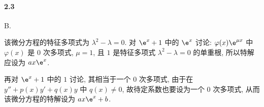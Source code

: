 \paragraph*{2.3} B.

该微分方程的特征多项式为 $\lambda^2 - \lambda = 0$. 对 $\e^x + 1$ 中的 $\e^x$ 讨论: $\varphi(x)\e^{\mu x}$ 中 $\varphi(x)$ 是 $0$ 次多项式, $\mu = 1$, 且 $1$ 是特征多项式 $\lambda^2 - \lambda = 0$ 的单重根, 所以特解应设为 $ax\e^x$.

再对 $\e^x + 1$ 中的 $1$ 讨论, 其相当于一个 $0$ 次多项式, 由于在 $y'' + p(x)y' + q(x)y$ 中 $q(x) \neq 0$, 故待定系数也要设为一个 $0$ 次多项式, 从而该微分方程的特解设为 $ax\e^x + b$.